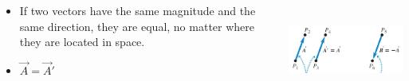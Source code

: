 \documentclass[]{beamer}
\begin{document}
      \begin{frame}



        \begin{columns}[c]
        \column{2.5in}  %
       
     
     \begin{itemize}
     
     
     \item If two vectors have the same magnitude and the same direction, they are equal, 
     no matter where they are located in space.
     
     \item $\vec{A}=\vec{A}'$
     \end{itemize}
     
     
        \column{2in}
     
     
       \begin{center}
       \includegraphics[height=1.5in]{images/paralel_vec.jpg}
     \end{center}
     
     
        \end{columns}
     
     
     
     
     \end{frame}
\end{document}
